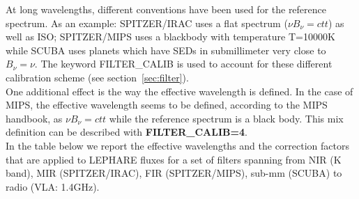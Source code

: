 \documentclass[12pt]{article}
\begin{document}
 At long wavelengths,  different conventions have been used for the reference spectrum.
 As an example:  SPITZER/IRAC uses a flat spectrum ($\nu B_{\nu}=ctt$) as well as ISO;
  SPITZER/MIPS uses a blackbody with temperature T=10000K
 while  SCUBA uses planets which have SEDs in submillimeter very close to  $B_{\nu}=\nu$.
 The keyword FILTER\_CALIB  is used to account for these different calibration scheme  
  (see section~\ref{sec:filter}). \\
  One additional effect is the way the effective wavelength is defined. In the case of MIPS, 
  the effective wavelength seems to be defined, according to the MIPS handbook, as
  $\nu B_{\nu}=ctt$ while the reference spectrum is a black body.  This mix definition 
  can be described with {\bf FILTER\_CALIB=4}. \\
  
  In the table below we report the effective wavelengths and the correction factors that are
  applied to LEPHARE fluxes for a set of filters spanning from NIR (K band),
  MIR (SPITZER/IRAC), FIR (SPITZER/MIPS), sub-mm (SCUBA)  to radio (VLA: 1.4GHz). \\
%     
 
\end{document}
